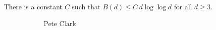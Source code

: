 \begin{frame}[plain]
\begin{conj}
There is a constant $C$ such that $B(d) \leq C\, d \log\log d$ for all $d \geq 3$.
\end{conj}
	\begin{figure}[h]
	\centering
	\begin{subfigure}{0.3\textwidth}
	\captionsetup{labelformat=empty}
	\centering
	\caption{Pete Clark}
	\end{subfigure} \quad
	\begin{subfigure}{0.3\textwidth}
	\captionsetup{labelformat=empty}
	\centering

\end{subfigure}
\end{figure}
\end{frame}
